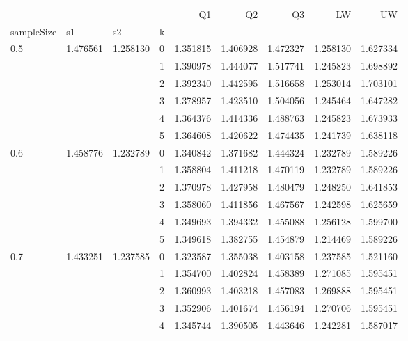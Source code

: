 \begin{tabular}{llllrrrrr}
\toprule
    &          &          &   &        Q1 &        Q2 &        Q3 &        LW &        UW \\
sampleSize & s1 & s2 & k &           &           &           &           &           \\
\midrule
0.5 & 1.476561 & 1.258130 & 0 &  1.351815 &  1.406928 &  1.472327 &  1.258130 &  1.627334 \\
    &          &          & 1 &  1.390978 &  1.444077 &  1.517741 &  1.245823 &  1.698892 \\
    &          &          & 2 &  1.392340 &  1.442595 &  1.516658 &  1.253014 &  1.703101 \\
    &          &          & 3 &  1.378957 &  1.423510 &  1.504056 &  1.245464 &  1.647282 \\
    &          &          & 4 &  1.364376 &  1.414336 &  1.488763 &  1.245823 &  1.673933 \\
    &          &          & 5 &  1.364608 &  1.420622 &  1.474435 &  1.241739 &  1.638118 \\
0.6 & 1.458776 & 1.232789 & 0 &  1.340842 &  1.371682 &  1.444324 &  1.232789 &  1.589226 \\
    &          &          & 1 &  1.358804 &  1.411218 &  1.470119 &  1.232789 &  1.589226 \\
    &          &          & 2 &  1.370978 &  1.427958 &  1.480479 &  1.248250 &  1.641853 \\
    &          &          & 3 &  1.358060 &  1.411856 &  1.467567 &  1.242598 &  1.625659 \\
    &          &          & 4 &  1.349693 &  1.394332 &  1.455088 &  1.256128 &  1.599700 \\
    &          &          & 5 &  1.349618 &  1.382755 &  1.454879 &  1.214469 &  1.589226 \\
0.7 & 1.433251 & 1.237585 & 0 &  1.323587 &  1.355038 &  1.403158 &  1.237585 &  1.521160 \\
    &          &          & 1 &  1.354700 &  1.402824 &  1.458389 &  1.271085 &  1.595451 \\
    &          &          & 2 &  1.360993 &  1.403218 &  1.457083 &  1.269888 &  1.595451 \\
    &          &          & 3 &  1.352906 &  1.401674 &  1.456194 &  1.270706 &  1.595451 \\
    &          &          & 4 &  1.345744 &  1.390505 &  1.443646 &  1.242281 &  1.587017 \\

\end{tabular}
